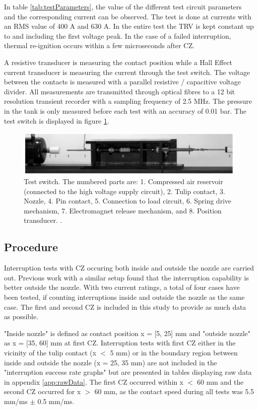 \documentclass[10pt,a4paper,twoside]{article}
\begin{document}
In table \ref{tab:testParameters}, the value of the different test circuit parameters and the corresponding current can be observed. The test is done at currents with an RMS value of 400 A and 630 A. In the entire test the TRV is kept constant up to and including the first voltage peak. In the case of a failed interruption, thermal re-ignition occurs within a few microseconds after CZ.

A resistive transducer is measuring the contact position while a Hall Effect current transducer is measuring the current through the test switch. The voltage between the contacts is measured with a parallel resistive / capacitive voltage divider. All measurements are transmitted through optical fibres to a 12 bit resolution transient recorder with a sampling frequency of 2.5 MHz. The pressure in the tank is only measured before each test with an accuracy of 0.01 bar. The test switch is displayed in figure \ref{fig:testSwitchRiggEq}.

\begin{figure} [H]
\centering
\includegraphics[scale=0.5]{Bilder/Method/switchTest.png}
\caption{Test switch. The numbered parts are: 1. Compressed air reservoir (connected to the high voltage supply circuit), 2. Tulip contact, 3. Nozzle, 4. Pin
contact, 5. Connection to load circuit, 6. Spring drive mechanism, 7. Electromagnet release mechanism, and 8. Position transducer. \cite{bib:AFIMVLBA}.} \label{fig:testSwitchRiggEq}
\end{figure}

\newpage
\subsection{Procedure} \label{sec:procedure}
Interruption tests with CZ occuring both inside and outside the nozzle are carried out. Previous work with a similar setup found that the interruption capability is better outside the nozzle. With two current ratings, a total of four cases have been tested, if counting interruptions inside and outside the nozzle as the same case. The first and second CZ is included in this study to provide as much data as possible.

"Inside nozzle" is defined as contact position x = [5, 25] mm and "outside nozzle" as x = [35, 60] mm at first CZ. Interruption tests with first CZ either in the vicinity of the tulip contact (x $<$ 5 mm) or in the boundary region between inside and outside the nozzle (x = 25, 35 mm) are not included in the "interruption success rate graphs" but are presented in tables displaying raw data in appendix \ref{app:rawData}. The first CZ occurred within x $<$ 60 mm and the second CZ occurred for x $>$ 60 mm, as the contact speed during all tests was 5.5 mm/ms $\pm$ 0.5 mm/ms.
\end{document}
